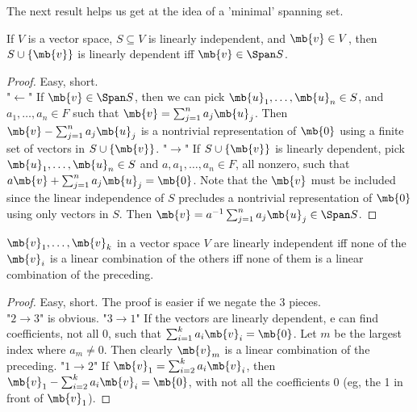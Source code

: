 The next result helps us get at the idea of a 'minimal' spanning set.
\begin{lem}\label{l:span-LD}
If $V$ is a vector space, $S \subseteq V$ is linearly independent, and $\mb{v}\in V$, then $S \cup \{ \mb{v}\}$ is linearly dependent iff $\mb{v}\in \Span S$. 
\end{lem}
\begin{proof}
Easy, short.\\
"$\leftarrow$" If $\mb{v}\in \Span S$, then we can pick $\mb{u}_1, \ldots, \mb{u}_n \in S$, and $a_1, \ldots,a_n \in F$ such that $\mb{v}= \sum_{j=1}^na_j \mb{u}_j$. Then $\mb{v}- \sum_{j=1}^na_j \mb{u}_j$ is a nontrivial representation of $\mb{0}$ using a finite set of vectors in $S \cup \{ \mb{v}\}$.
"$\to$" If $S \cup \{ \mb{v}\}$ is linearly dependent, pick $\mb{u}_1, \ldots, \mb{u}_n \in S$ and $a,a_1, \ldots,a_n \in F$, all nonzero, such that $a \mb{v}+ \sum_{j=1}^na_j \mb{u}_j= \mb{0}$. Note that the $\mb{v}$ must be included since the linear independence of $S$ precludes a nontrivial representation of $\mb{0}$ using only vectors in $S$. Then $\mb{v}=a^{-1}\sum_{j=1}^na_j \mb{u}_j \in \Span S$.
\end{proof}
\begin{lem}\label{l:LD-lincomb}%
$\mb{v}_1, \ldots, \mb{v}_k$ in a vector space $V$ are linearly independent iff none of the $\mb{v}_i$ is a linear combination of the others iff none of them is a linear combination of the preceding.\\
\end{lem}
\begin{proof}
Easy, short. The proof is easier if we negate the 3 pieces.\\
"$2 \to 3$" is obvious. "$3 \to 1$" If the vectors are linearly dependent, e can find coefficients, not all 0, such that $\sum_{i=1}^ka_i \mb{v}_i= \mb{0}$. Let $m$ be the largest index where $a_m \neq 0$. Then clearly $\mb{v}_m$ is a linear combination of the preceding.
"$1 \to 2$" If $\mb{v}_1= \sum_{i=2}^ka_i \mb{v}_i$, then $\mb{v}_1- \sum_{i=2}^ka_i \mb{v}_i= \mb{0}$, with not all the coefficients 0 (eg, the 1 in front of $\mb{v}_1$).
\end{proof}


